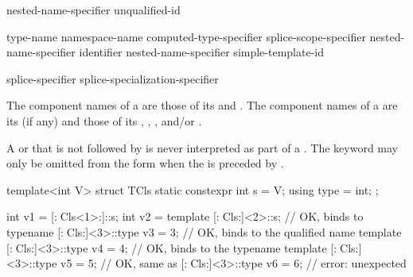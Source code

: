 %
%
%
\begin{bnf}
\br
    nested-name-specifier  unqualified-id
\end{bnf}

%
%
%
\begin{bnf}
\br
    \terminal{::}\br
    type-name \terminal{::}\br
    namespace-name \terminal{::}\br
    computed-type-specifier \terminal{::}\br
    splice-scope-specifier \terminal{::}\br
    nested-name-specifier identifier \terminal{::}\br
    nested-name-specifier  simple-template-id \terminal{::}
\end{bnf}
\begin{bnf}
\br
    splice-specifier\br
     splice-specialization-specifier
\end{bnf}

\pnum
{}%
The component names of a  are those of
its  and .
The component names of a  are
its  (if any) and those of its
,
,
, and/or
.

\pnum
A  or
that is not followed by \tcode{::}
is never interpreted as part of a .
The keyword  may only be omitted
from the form
when the 
is preceded by .
\begin{example}
\begin{codeblock}
template<int V>
struct TCls {
  static constexpr int s = V;
  using type = int;
};

int v1 = [:^^TCls<1>:]::s;
int v2 = template [:^^TCls:]<2>::s;             // OK,  binds to 
typename [:^^TCls:]<3>::type v3 = 3;            // OK,  binds to the qualified name
template [:^^TCls:]<3>::type v4 = 4;            // OK,  binds to the 
typename template [:^^TCls:]<3>::type v5 = 5;   // OK, same as 
[:^^TCls:]<3>::type v6 = 6;                     // error: unexpected \tcode{<}
\end{codeblock}
\end{example}

